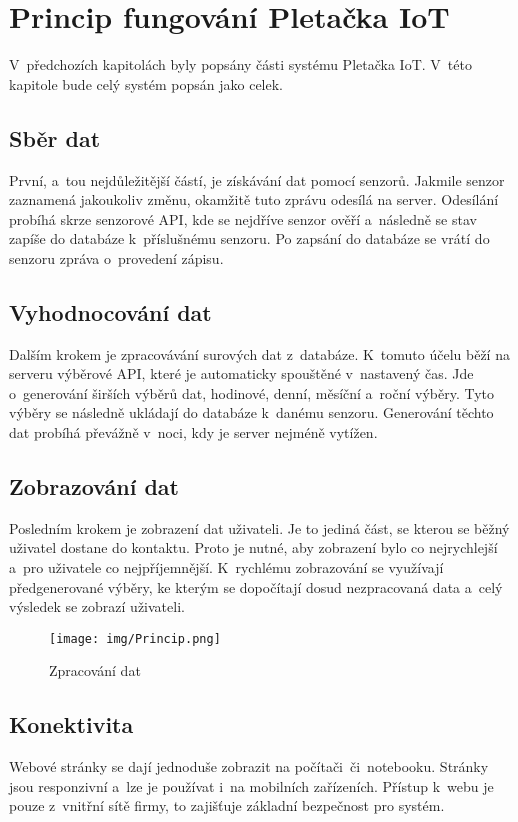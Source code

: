\chapter{Princip fungování Pletačka IoT}
V~předchozích kapitolách byly popsány části systému Pletačka IoT.
V~této kapitole bude celý systém popsán jako celek.


\section{Sběr dat}
První, a~tou nejdůležitější částí, je získávání dat pomocí senzorů.
Jakmile senzor zaznamená jakoukoliv změnu, okamžitě tuto zprávu odesílá na server.
Odesílání probíhá skrze senzorové API, kde se nejdříve senzor ověří a~následně se stav zapíše do databáze k~příslušnému senzoru.
Po zapsání do databáze se vrátí do senzoru zpráva o~provedení zápisu. 


\section{Vyhodnocování dat}
Dalším krokem je zpracovávání surových dat z~databáze.
K~tomuto účelu běží na serveru výběrové API, které je automaticky spouštěné v~nastavený čas.
Jde o~generování širších výběrů dat, hodinové, denní, měsíční a~roční výběry.
Tyto výběry se následně ukládají do databáze k~danému senzoru.
Generování těchto dat probíhá převážně v~noci, kdy je server nejméně vytížen.


\section{Zobrazování dat}
Posledním krokem je zobrazení dat uživateli.
Je to jediná část, se kterou se běžný uživatel dostane do kontaktu.
Proto je nutné, aby zobrazení bylo co nejrychlejší a~pro uživatele co nejpříjemnější.
K~rychlému zobrazování se využívají předgenerované výběry, ke kterým se dopočítají dosud nezpracovaná data a~celý výsledek se zobrazí uživateli.





\begin{figure}[htbp]
    \centering
    \texttt{[image: img/Princip.png]}
    \caption{Zpracování dat}
    \label{fig:princip}
\end{figure}

\section{Konektivita}
Webové stránky se dají jednoduše zobrazit na počítači~či~notebooku.
Stránky jsou responzivní a~lze je používat i~na mobilních zařízeních.
Přístup k~webu je pouze z~vnitřní sítě firmy, to zajišťuje základní bezpečnost pro systém.


\newpage